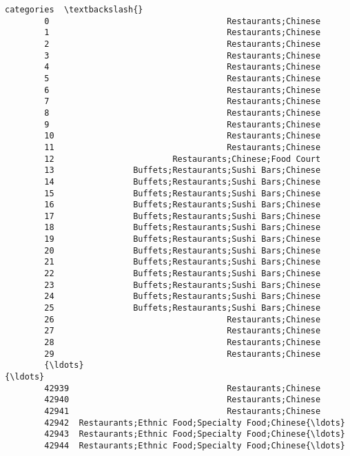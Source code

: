 \documentclass[11pt]{article}
\begin{document}
\begin{Verbatim}[commandchars=\\\{\}]
                                                      categories  \textbackslash{}
        0                                    Restaurants;Chinese   
        1                                    Restaurants;Chinese   
        2                                    Restaurants;Chinese   
        3                                    Restaurants;Chinese   
        4                                    Restaurants;Chinese   
        5                                    Restaurants;Chinese   
        6                                    Restaurants;Chinese   
        7                                    Restaurants;Chinese   
        8                                    Restaurants;Chinese   
        9                                    Restaurants;Chinese   
        10                                   Restaurants;Chinese   
        11                                   Restaurants;Chinese   
        12                        Restaurants;Chinese;Food Court   
        13                Buffets;Restaurants;Sushi Bars;Chinese   
        14                Buffets;Restaurants;Sushi Bars;Chinese   
        15                Buffets;Restaurants;Sushi Bars;Chinese   
        16                Buffets;Restaurants;Sushi Bars;Chinese   
        17                Buffets;Restaurants;Sushi Bars;Chinese   
        18                Buffets;Restaurants;Sushi Bars;Chinese   
        19                Buffets;Restaurants;Sushi Bars;Chinese   
        20                Buffets;Restaurants;Sushi Bars;Chinese   
        21                Buffets;Restaurants;Sushi Bars;Chinese   
        22                Buffets;Restaurants;Sushi Bars;Chinese   
        23                Buffets;Restaurants;Sushi Bars;Chinese   
        24                Buffets;Restaurants;Sushi Bars;Chinese   
        25                Buffets;Restaurants;Sushi Bars;Chinese   
        26                                   Restaurants;Chinese   
        27                                   Restaurants;Chinese   
        28                                   Restaurants;Chinese   
        29                                   Restaurants;Chinese   
        {\ldots}                                                  {\ldots}   
        42939                                Restaurants;Chinese   
        42940                                Restaurants;Chinese   
        42941                                Restaurants;Chinese   
        42942  Restaurants;Ethnic Food;Specialty Food;Chinese{\ldots}   
        42943  Restaurants;Ethnic Food;Specialty Food;Chinese{\ldots}   
        42944  Restaurants;Ethnic Food;Specialty Food;Chinese{\ldots}   

\end{Verbatim}
\end{document}
